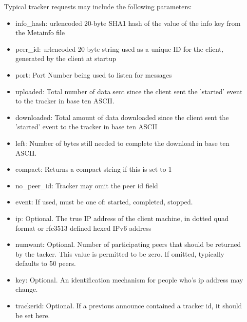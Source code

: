 \documentclass[letter]{scrartcl}
\begin{document}
Typical tracker requests may include the following parameters:
\begin{itemize}
\item info\_hash: urlencoded 20-byte SHA1 hash of the value of the info key from the Metainfo file
\item peer\_id: urlencoded 20-byte string used as a unique ID for the client, generated by the client at startup
\item port: Port Number being used to listen for messages
\item uploaded: Total number of data sent since the client sent the 'started' event to the tracker in base ten ASCII.
\item downloaded:  Total amount of data downloaded since the client sent the 'started' event to the tracker in base ten ASCII
\item left: Number of bytes still needed to complete the download in base ten ASCII.
\item compact: Returns a compact string if this is set to 1
\item no\_peer\_id: Tracker may omit the peer id field
\item event:  If used, must be one of: started, completed, stopped.
\item ip: Optional. The true IP address of the client machine, in dotted quad format or rfc3513 defined hexed IPv6 address
\item numwant: Optional. Number of participating peers that should be returned by the tacker. This value is permitted to be zero. If omitted, typically defaults to 50 peers.
\item key: Optional. An identification mechanism for people who's ip address may change. 
\item trackerid: Optional. If a previous announce contained a tracker id, it should be set here.
\end{itemize}
\end{document}
